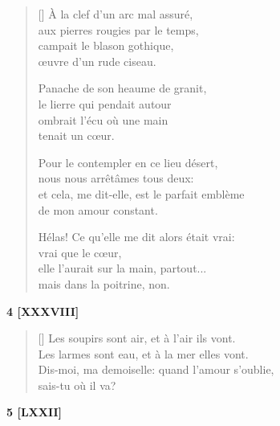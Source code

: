 \documentclass[a4paper,12pt]{book}
\begin{document}
\settowidth{\versewidth}{et cela, me dit-elle, est le parfait emblème}

\begin{verse}[\versewidth]
  À la clef d'un arc mal assuré, \\
  aux pierres rougies par le temps, \\
  campait le blason gothique, \\
  œuvre d'un rude ciseau.

  Panache de son heaume de granit, \\
  le lierre qui pendait autour \\
  ombrait l'écu où une main \\
  tenait un cœur.

  Pour le contempler en ce lieu désert, \\
  nous nous arrêtâmes tous deux: \\
  et cela, me dit-elle, est le parfait emblème \\
  de mon amour constant.

  Hélas! Ce qu'elle me dit alors était vrai: \\
  vrai que le cœur, \\
  elle l'aurait sur la main, partout... \\
  mais dans la poitrine, non.
\end{verse}

\bigskip

\begin{center}
  \textbf{4 [XXXVIII]}
\end{center}

\settowidth{\versewidth}{Les larmes sont eau, et à la mer elles vont.}

\begin{verse}[\versewidth]
  Les soupirs sont air, et à l'air ils vont. \\
  Les larmes sont eau, et à la mer elles vont. \\
  Dis-moi, ma demoiselle: quand l'amour s'oublie, \\
  sais-tu où il va?
\end{verse}

\bigskip

\begin{center}
  \textbf{5 [LXXII]}
\end{center}
\end{document}
